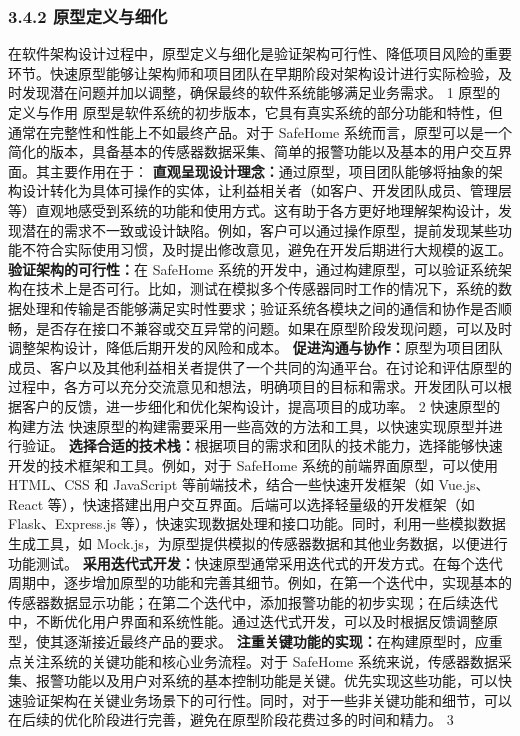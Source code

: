 \subsubsection{3.4.2 原型定义与细化}\label{ux539fux578bux5b9aux4e49ux4e0eux7ec6ux5316}
在软件架构设计过程中，原型定义与细化是验证架构可行性、降低项目风险的重要环节。快速原型能够让架构师和项目团队在早期阶段对架构设计进行实际检验，及时发现潜在问题并加以调整，确保最终的软件系统能够满足业务需求。 1 原型的定义与作用
原型是软件系统的初步版本，它具有真实系统的部分功能和特性，但通常在完整性和性能上不如最终产品。对于 SafeHome 系统而言，原型可以是一个简化的版本，具备基本的传感器数据采集、简单的报警功能以及基本的用户交互界面。其主要作用在于：
\textbf{直观呈现设计理念：}通过原型，项目团队能够将抽象的架构设计转化为具体可操作的实体，让利益相关者（如客户、开发团队成员、管理层等）直观地感受到系统的功能和使用方式。这有助于各方更好地理解架构设计，发现潜在的需求不一致或设计缺陷。例如，客户可以通过操作原型，提前发现某些功能不符合实际使用习惯，及时提出修改意见，避免在开发后期进行大规模的返工。
\textbf{验证架构的可行性：}在 SafeHome
系统的开发中，通过构建原型，可以验证系统架构在技术上是否可行。比如，测试在模拟多个传感器同时工作的情况下，系统的数据处理和传输是否能够满足实时性要求；验证系统各模块之间的通信和协作是否顺畅，是否存在接口不兼容或交互异常的问题。如果在原型阶段发现问题，可以及时调整架构设计，降低后期开发的风险和成本。
\textbf{促进沟通与协作：}原型为项目团队成员、客户以及其他利益相关者提供了一个共同的沟通平台。在讨论和评估原型的过程中，各方可以充分交流意见和想法，明确项目的目标和需求。开发团队可以根据客户的反馈，进一步细化和优化架构设计，提高项目的成功率。
2 快速原型的构建方法 快速原型的构建需要采用一些高效的方法和工具，以快速实现原型并进行验证。 \textbf{选择合适的技术栈：}根据项目的需求和团队的技术能力，选择能够快速开发的技术框架和工具。例如，对于 SafeHome
系统的前端界面原型，可以使用 HTML、CSS 和 JavaScript 等前端技术，结合一些快速开发框架（如 Vue.js、React 等），快速搭建出用户交互界面。后端可以选择轻量级的开发框架（如 Flask、Express.js
等），快速实现数据处理和接口功能。同时，利用一些模拟数据生成工具，如 Mock.js，为原型提供模拟的传感器数据和其他业务数据，以便进行功能测试。
\textbf{采用迭代式开发：}快速原型通常采用迭代式的开发方式。在每个迭代周期中，逐步增加原型的功能和完善其细节。例如，在第一个迭代中，实现基本的传感器数据显示功能；在第二个迭代中，添加报警功能的初步实现；在后续迭代中，不断优化用户界面和系统性能。通过迭代式开发，可以及时根据反馈调整原型，使其逐渐接近最终产品的要求。
\textbf{注重关键功能的实现：}在构建原型时，应重点关注系统的关键功能和核心业务流程。对于 SafeHome
系统来说，传感器数据采集、报警功能以及用户对系统的基本控制功能是关键。优先实现这些功能，可以快速验证架构在关键业务场景下的可行性。同时，对于一些非关键功能和细节，可以在后续的优化阶段进行完善，避免在原型阶段花费过多的时间和精力。 3
